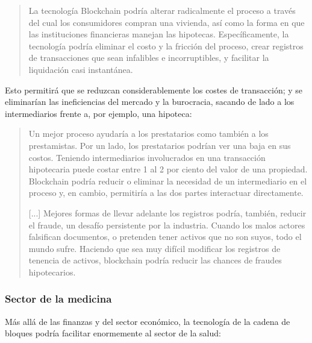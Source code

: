 \documentclass[12pt,a4paper,twoside]{book}
\begin{document}
\begin{quotation}
La tecnología Blockchain podría alterar radicalmente el proceso a través del cual los consumidores compran una vivienda, así como la forma en que las instituciones financieras manejan las hipotecas. Específicamente, la tecnología podría eliminar el costo y la fricción del proceso, crear registros de transacciones que sean infalibles e incorruptibles, y facilitar la liquidación casi instantánea. \cite[pág. 2]{pwc:criptos}
\end{quotation}

Esto permitirá que se reduzcan considerablemente los costes de transacción; y se eliminarían las ineficiencias del mercado y la burocracia, sacando de lado a los intermediarios frente a, por ejemplo, una hipoteca:

\begin{quotation}
Un mejor proceso ayudaría a los prestatarios como también a los prestamistas. Por un lado, los prestatarios podrían ver una baja en sus costos. Teniendo intermediarios involucrados en una transacción hipotecaria puede costar entre 1 al 2 por ciento del valor de una propiedad. Blockchain podría reducir o eliminar la necesidad de un intermediario en el proceso y, en cambio, permitiría a las dos partes interactuar directamente.

[...] Mejores formas de llevar adelante los registros podría, también, reducir el fraude, un desafío persistente por la industria. Cuando los malos actores falsifican documentos, o pretenden tener activos que no son suyos, todo el mundo sufre. Haciendo que sea muy difícil modificar los registros de tenencia de activos, blockchain podría reducir las chances de fraudes hipotecarios. \cite[pág. 3]{pwc:criptos}
\end{quotation}

\subsubsection{Sector de la medicina}
Más allá de las finanzas y del sector económico, la tecnología de la cadena de bloques podría facilitar enormemente al sector de la salud:
\end{document}
